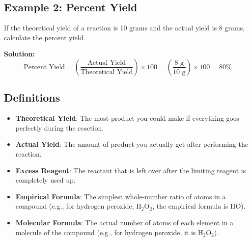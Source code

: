 \documentclass{article}
\begin{document}
\subsection*{Example 2: Percent Yield}
If the theoretical yield of a reaction is 10 grams and the actual yield is 8 grams, calculate the percent yield.

\textbf{Solution:}
\[
\text{Percent Yield} = \left( \frac{\text{Actual Yield}}{\text{Theoretical Yield}} \right) \times 100 = \left( \frac{8 \text{ g}}{10 \text{ g}} \right) \times 100 = 80\%
\]

\subsection*{Definitions}
\begin{itemize}
    \item \textbf{Theoretical Yield}: The most product you could make if everything goes perfectly during the reaction.
    \item \textbf{Actual Yield}: The amount of product you actually get after performing the reaction.
    \item \textbf{Excess Reagent}: The reactant that is left over after the limiting reagent is completely used up.
    \item \textbf{Empirical Formula}: The simplest whole-number ratio of atoms in a compound (e.g., for hydrogen peroxide, H\(_2\)O\(_2\), the empirical formula is HO).
    \item \textbf{Molecular Formula}: The actual number of atoms of each element in a molecule of the compound (e.g., for hydrogen peroxide, it is H\(_2\)O\(_2\)).
\end{itemize}
\end{document}
